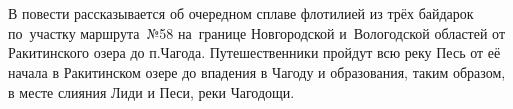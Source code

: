 \chapter*{}
В повести рассказывается об очередном сплаве флотилией из трёх байдарок по~участку маршрута~№58 \cite{Рыжавский1,Рыжавский2} на~границе Новгородской и~Вологодской областей от Ракитинского озера до п.\thinspace Чагода. Путешественники пройдут всю реку Песь от её начала в Ракитинском озере до впадения в Чагоду и образования, таким образом, в месте слияния Лиди и Песи, реки Чагодощи.

